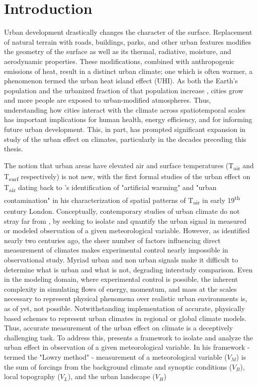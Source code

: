 \chapter{Introduction}
Urban development drastically changes the character of the surface. Replacement of natural terrain with roads, buildings, parks, and other urban features modifies the geometry of the surface as well as its thermal, radiative, moisture, and aerodynamic properties. These modifications, combined with anthropogenic emissions of heat, result in a distinct urban climate; one which is often warmer, a phenomenon termed the urban heat island effect (UHI). As both the Earth's population and the urbanized fraction of that population increase \citep{Nations2014}, cities grow and more people are exposed to urban-modified atmospheres. Thus, understanding how cities interact with the climate across spatiotemporal scales has important implications for human health, energy efficiency, and for informing future urban development. This, in part, has prompted significant expansion in study of the urban effect on climates, particularly in the decades preceding this thesis. 

The notion that urban areas have elevated air and surface temperatures (T\textsubscript{air} and T\textsubscript{surf} respectively) is not new, with the first formal studies of the urban effect on T\textsubscript{air} dating back to \citet{Howard1833}'s identification of "artificial warming" and "urban contamination" in his characterization of spatial patterns of T\textsubscript{air} in early 19\textsuperscript{th} century London. Conceptually, contemporary studies of urban climate do not stray far from \citet{Howard1833}, by seeking to isolate and quantify the urban signal in measured or modeled observation of a given meteorological variable. However, as \citet{Howard1833} identified nearly two centuries ago, the sheer number of factors influencing direct measurement of climates makes experimental control nearly impossible in observational study. Myriad urban and non urban signals make it difficult to determine what is urban and what is not, degrading interstudy comparison. Even in the modeling domain, where experimental control is possible, the inherent complexity in simulating flows of energy, momentum, and mass at the scales necessary to represent physical phenomena over realistic urban environments is, as of yet, not possible. Notwithstanding implementation of accurate, physically based schemes to represent urban climates in regional or global climate models. Thus, accurate measurement of the urban effect on climate is a deceptively challenging task. To address this, \citet{Lowry1977} presents a framework to isolate and analyze the urban effect in observation of a given meteorological variable. In his framework - termed the "Lowry method" - measurement of a meteorological variable ($V_M$) is the sum of forcings from the background climate and synoptic conditions ($V_B$), local topography ($V_L$), and the urban landscape ($V_H$)

